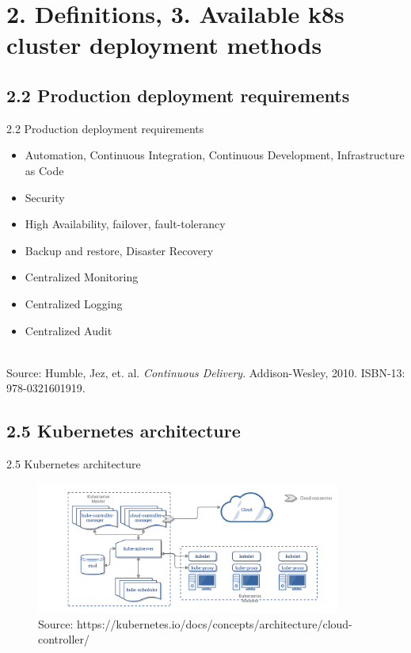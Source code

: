 \documentclass{beamer}
\begin{document}
\section{2. Definitions, 3. Available k8s cluster deployment methods}
\subsection{2.2 Production deployment requirements}
\begin{frame}{2.2 Production deployment requirements}%
\begin{itemize}
	\item Automation, Continuous Integration, Continuous Development, Infrastructure as Code
	\item Security
	\item High Availability, failover, fault-tolerancy
	\item Backup and restore, Disaster Recovery
	\item Centralized Monitoring
	\item Centralized Logging
	\item Centralized Audit
\end{itemize}
\\
\tiny{Source: Humble, Jez, et. al. \textit{Continuous Delivery}. Addison-Wesley, 2010. ISBN-13: 978-0321601919.}
\end{frame}

\subsection{2.5 Kubernetes architecture}
\begin{frame}{2.5 Kubernetes architecture}%
\begin{figure}
	\includegraphics[width=10cm]{figures/k8s-arch.png}
	\label{fig:k8s-arch}
	\tiny{Source: https://kubernetes.io/docs/concepts/architecture/cloud-controller/}
\end{figure}
\end{frame}
\end{document}
